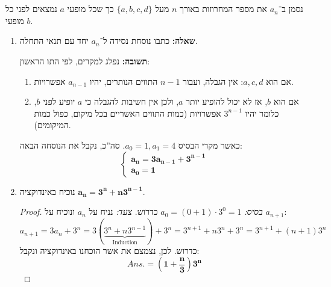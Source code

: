 \documentclass[]{article}
\newcommand\ans   {\mathit{Ans.}}
\begin{document}
	\section{} %
	נסמן ב־$a_n$ את מספר המחרוזות באורך $n$ מעל $\{a, b, c, d\}$ כך שכל מופעי $a$ נמצאים לפני כל מופעי $b$. 
	\begin{enumerate}
		\item \textbf{שאלה: }כתבו נוסחת נסידה ל־$a_n$ יחד עם תנאי התחלה. 
		
		\textbf{תשובה: }נפלג למקרים, לפי התו הראשון: 
		\begin{enumerate}
			\item אם הוא $a, c, d$: אין הגבלה, ועבור $n - 1$ התווים הנותרים, יהיו $a_{n - 1}$ אפשרויות. 
			\item אם הוא $b$, אז לא יכול להופיע יותר $a$, ולכן אין חשיבות להגבלה כי $a$ יופיע לפני $b$, כלומר יהיו $3^{n - 1}$ אפשרויות (כמות התווים האשריים בכל מיקום, כפול כמות המיקומים). 
		\end{enumerate}
		כאשר מקרי הבסיס $a_0 = 1, a_1 = 4 $. 
		סה''כ, נקבל את הנוסחה הבאה: 
		\[ \begin{cases}
			\bm{a_n = 3a_{n - 1} + 3^{n - 1}} \\
			\bm{a_0 = 1}
		\end{cases} \]
		\item נוכיח באינדוקציה $\bm{a_n = 3^n + n3^{n - 1}}$. \begin{proof}
			\textit{בסיס: }$a_0 = (0 + 1) \cdot 3^{0} = 1 $ כדרוש. \textit{צעד: }נניח על $a_n$ ונוכיח על $a_{n + 1}$: 
			\[ a_{n + 1} = 3a_n + 3^{n} = 3(\underbrace{3^{n} + n3^{n - 1}}_{\mathrm{Induction}}) + 3^{n} = 3^{n + 1} + n3^{n} + 3^{n} = 3^{n + 1} + (n + 1)3^{n} \]
			כדרוש. לכן, נצמצם את אשר הוכחנו באינדוקציה ונקבל: 
			\[\bm{\ans = \left (1 + \frac{n}{3}\right )3^{n}} \]
		\end{proof}
	\end{enumerate}
\end{document}
